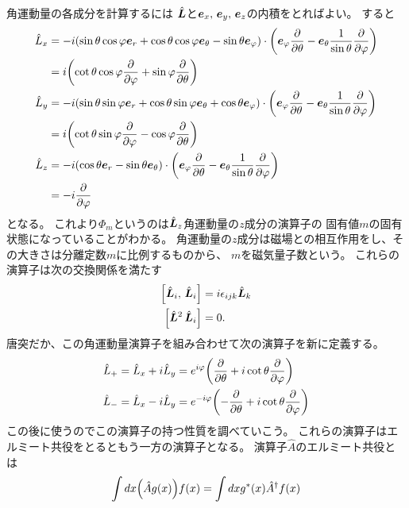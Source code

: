 \documentclass[../master.tex]{subfiles}
\begin{document}
角運動量の各成分を計算するには
\(\hat{\vb*{L}}\)と\(\vb*{e}_x,\,\vb*{e}_y,\,\vb*{e}_z\)の内積をとればよい。
すると
\begin{align}
	\hat{L}_x
	 & = -i(\sin\theta\cos\varphi \vb*{e}_r + \cos\theta\cos\varphi \vb*{e}_\theta - \sin\theta \vb*{e}_\varphi) \cdot
	\qty(\vb*{e}_{\varphi}\pdv{\theta}-\vb*{e}_{\theta}\frac{1}{\sin\theta}\pdv{\varphi}) \notag                       \\
	 & = i\qty(\cot\theta\cos\varphi\pdv{\varphi}+\sin\varphi\pdv{\theta})                                             \\
	\hat{L}_y
	 & = -i(\sin\theta\sin\varphi \vb*{e}_r + \cos\theta\sin\varphi \vb*{e}_\theta + \cos\theta \vb*{e}_\varphi) \cdot
	\qty(\vb*{e}_{\varphi}\pdv{\theta}-\vb*{e}_{\theta}\frac{1}{\sin\theta}\pdv{\varphi}) \notag                       \\
	 & = i\qty(\cot\theta\sin\varphi\pdv{\varphi}-\cos\varphi\pdv{\theta})                                             \\
	\hat{L}_z
	 & = -i(\cos\theta\vb*{e}_r -\sin\theta\vb*{e}_\theta) \cdot
	\qty(\vb*{e}_{\varphi}\pdv{\theta}-\vb*{e}_{\theta}\frac{1}{\sin\theta}\pdv{\varphi}) \notag                       \\
	 & = -i\pdv{\varphi}
\end{align}
となる。
これより\(\Phi_m\)というのは\(\hat{\vb*{L}}_z\)角運動量の\(z\)成分の演算子の
固有値\(m\)の固有状態になっていることがわかる。
角運動量の\(z\)成分は磁場との相互作用をし、その大きさは分離定数\(m\)に比例するものから、
\(m\)を磁気量子数という。
これらの演算子は次の交換関係を満たす
\begin{align}
	\qty[\hat{\vb*{L}}_i,\,\hat{\vb*{L}}_i] & = i\epsilon_{ijk}\hat{\vb*{L}}_k \\
	\qty[\hat{\vb*{L}}^2\,\hat{\vb*{L}}_i]  & =0.
\end{align}
唐突だか、この角運動量演算子を組み合わせて次の演算子を新に定義する。
\begin{align}
	\hat{L}_+ & = \hat{L}_x + i\hat{L}_y = e^{ i\varphi}\qty( \pdv{\theta} +i\cot\theta\pdv{\varphi}) \\
	\hat{L}_- & = \hat{L}_x - i\hat{L}_y = e^{-i\varphi}\qty(-\pdv{\theta} +i\cot\theta\pdv{\varphi})
\end{align}
この後に使うのでこの演算子の持つ性質を調べていこう。
これらの演算子はエルミート共役をとるともう一方の演算子となる。
演算子\(\hat{A}\)のエルミート共役とは
\begin{equation}
	\int dx \qty(\hat{A}g(x)) f(x) = \int dx g^*(x) \hat{A}^\dag f(x)
\end{equation}
\end{document}

